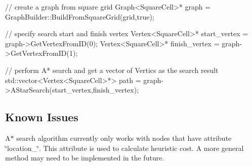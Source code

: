 \begin{DoxyCode}
\textcolor{comment}{// create a graph from square grid}
Graph<SquareCell>* graph = GraphBuilder::BuildFromSquareGrid(grid,\textcolor{keyword}{true});

\textcolor{comment}{// specify search start and finish vertex}
Vertex<SquareCell>* start\_vertex = graph->GetVertexFromID(0);
Vertex<SquareCell>* finish\_vertex = graph->GetVertexFromID(1);

\textcolor{comment}{// perform A* search and get a vector of Vertics as the search result}
std::vector<Vertex<SquareCell>*> path = graph->AStarSearch(start\_vertex,finish\_vertex);
\end{DoxyCode}


\subsection*{Known Issues}


\begin{DoxyItemize}
\item A$\ast$ search algorithm currently only works with nodes that have attribute \char`\"{}location\-\_\-\char`\"{}. This attribute is used to calculate heuristic cost. A more general method may need to be implemented in the future. 
\end{DoxyItemize}